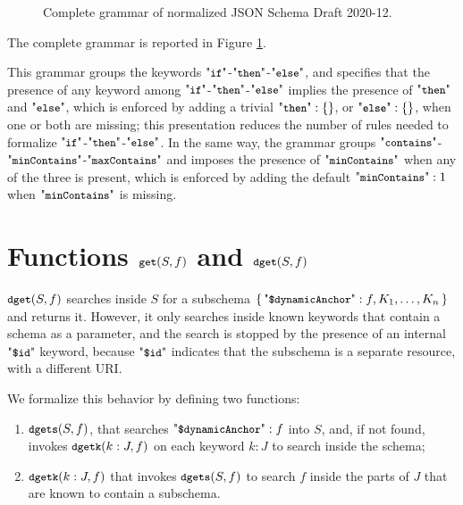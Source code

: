 \begin{toappendix}
\begin{figure}[h!]
\caption{Complete grammar of normalized JSON Schema Draft 2020-12.}
\label{fig:fullgrammar}
\end{figure}

{The complete grammar is reported in Figure \ref{fig:fullgrammar}.

This grammar groups the keywords $\qif$-$\qthen$-$\qelse$,
and specifies that the presence of any keyword among
$\aif$-$\athen$-$\aelse$ implies the presence of $\athen$ and $\aelse$,
which is enforced by adding a trivial $\qthen : \{\}$, or $\qelse : \{\}$, when one or both are missing;
this presentation reduces the number of rules needed to formalize $\qif$-$\qthen$-$\qelse$.
In the same way, the grammar groups $\acont$-$\aminC$-$\amaxC$ and imposes the presence
of $\aminC$ when any of the three is present, which is enforced by adding the default
 $\aminC: 1$ when $\aminC$ is missing.
}





\section{Functions $\mbox{\tt{\small get}}(S,f)$ and $\mbox{\tt{\small dget}}(S,f)$}\label{sec:get}


$\mbox{\tt{\small dget}}(S,f)$ searches inside $S$ for a subschema $\JObj{\qdda : f, K_1, \ldots, K_n }$ 
and returns it. However, it only searches inside known keywords that contain a schema as a 
parameter, and the search is stopped by the presence of an internal $\qdid$ keyword, because
$\qdid$ indicates that the subschema is a separate resource, with a different URI.


We formalize this behavior by defining two functions:
\begin{enumerate}
\item $\mbox{\tt{\small dgets}}(S,f)$, that searches $\qdda : f$ into $S$, and, if not found, invokes $\mbox{\tt{\small dgetk}}(k: J ,f)$ 
    on each keyword $k:J$ to search inside the schema;
\item $\mbox{\tt{\small dgetk}}(k:J,f)$ that invokes $\mbox{\tt{\small dgets}}(S,f)$ to search $f$ inside the parts of $J$ that are known
    to contain a subschema.
\end{enumerate}


\end{toappendix}
